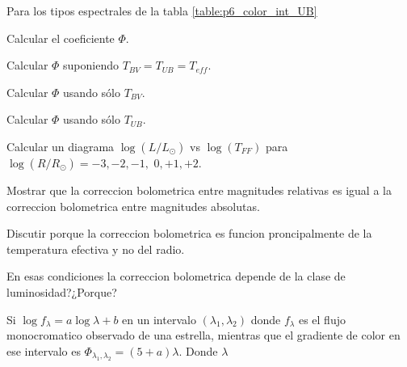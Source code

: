 \documentclass[12pt,a4paper]{practice}
\begin{document}
    \begin{problem}\label{prob:8}
        Para los tipos espectrales de la tabla \ref{table:p6_color_int_UB}

            \begin{ppart}\label{prob:8:a}
                Calcular el coeficiente $\Phi$.
            \end{ppart}

            \begin{ppart}\label{prob:8:b}
                Calcular $\Phi$ suponiendo $T_{BV} = T_{UB} = T_{eff}$.
            \end{ppart}

            \begin{ppart}\label{prob:8:c}
                Calcular $\Phi$ usando sólo $T_{BV}$.
            \end{ppart}

            \begin{ppart}\label{prob:8:d}
                Calcular $\Phi$ usando sólo $T_{UB}$.
            \end{ppart}
    \end{problem}

    \newpage
    \begin{problem}\label{prob:9}
        \begin{ppart}\label{prob:9:a}
            Calcular un diagrama $\log (L/L_{\odot})$ vs $\log (T_{FF})$ para $\log \left(R/R_{\odot}\right) = -3, -2, -1,$ $0, +1, +2$.
        \end{ppart}

        \begin{ppart}\label{prob:9:b}
            Mostrar que la correccion bolometrica entre magnitudes relativas es igual a la correccion bolometrica entre magnitudes absolutas.
        \end{ppart}
    \end{problem}

    \begin{problem}\label{prob:10}
        Discutir porque la correccion bolometrica es funcion proncipalmente de la temperatura efectiva y no del radio.

        En esas condiciones la correccion bolometrica depende de la clase de luminosidad?¿Porque?
    \end{problem}

    \begin{problem}\label{prob:11}
        Si $\log f_{\lambda} = a\log\lambda + b$ en un intervalo $(\lambda_{1}, \lambda_{2})$ donde $f_{\lambda}$ es el flujo monocromatico observado de una estrella, mientras que el gradiente de color en ese intervalo es $\Phi _{\lambda_{1},\lambda_{2}} = \left(5+a\right)\lambda$. Donde $\lambda$
    \end{problem}
\end{document}
